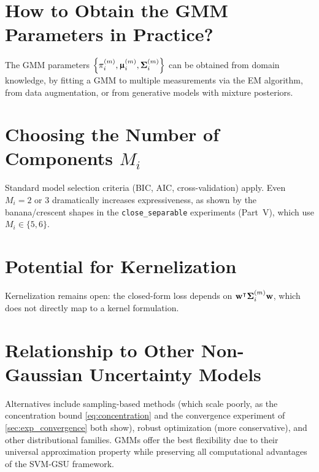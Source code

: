 \documentclass[11pt, letterpaper]{article}
\newcommand{\bSigma}{\vb{\Sigma}}
\newcommand{\bmu}{\boldsymbol{\upmu}}
\begin{document}
\section{How to Obtain the GMM Parameters in Practice?}\label{sec:discussion_gmm_params}

The GMM parameters $\left\{\pi_i^{(m)}, \bmu_i^{(m)}, \bSigma_i^{(m)}\right\}$ can be obtained from domain knowledge, by fitting a GMM to multiple measurements via the EM algorithm, from data augmentation, or from generative models with mixture posteriors.

\section{Choosing the Number of Components $M_i$}\label{sec:discussion_n_components}

Standard model selection criteria (BIC, AIC, cross-validation) apply. Even $M_i = 2$ or $3$ dramatically increases expressiveness, as shown by the banana/crescent shapes in the \texttt{close\_separable} experiments (Part~V), which use $M_i \in \{5, 6\}$.

\section{Potential for Kernelization}\label{sec:discussion_kernelization}

Kernelization remains open: the closed-form loss depends on $\vb{w}^{\intercal} \bSigma_i^{(m)} \vb{w}$, which does not directly map to a kernel formulation.

\section{Relationship to Other Non-Gaussian Uncertainty Models}\label{sec:discussion_other_models}

Alternatives include sampling-based methods (which scale poorly, as the concentration bound \cref{eq:concentration} and the convergence experiment of \cref{sec:exp_convergence} both show), robust optimization (more conservative), and other distributional families. GMMs offer the best flexibility due to their universal approximation property while preserving all computational advantages of the SVM-GSU framework.

\appendix
\end{document}
